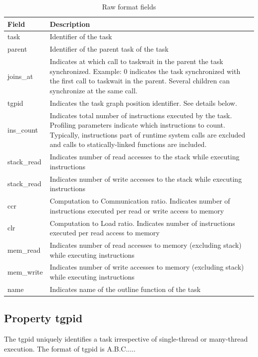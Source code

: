 \documentclass[11pt,a4paper,notitlepage]{article}
\begin{document}
\begin{table}[!htb]
\begin{tabular}{|p{2cm}|p{10cm}|}
\hline
\textbf{Field} & \textbf{Description} \\ \hline
task & Identifier of the task \\ \hline
parent & Identifier of the parent task of the task \\ \hline
joins\_at & Indicates at which call to taskwait in the parent the task synchronized. Example: 0 indicates the task synchronized with the first call to taskwait in the parent. Several children can synchronize at the same call.  \\ \hline
tgpid & Indicates the task graph position identifier. See details below.  \\ \hline
ins\_count & Indicates total number of instructions executed by the task. Profiling parameters indicate which instructions to count. Typically, instructions part of runtime system calls are excluded and calls to statically-linked functions are included.  \\ \hline
stack\_read & Indicates number of read accesses to the stack while executing instructions  \\ \hline
stack\_read & Indicates number of write accesses to the stack while executing instructions \\ \hline
ccr & Computation to Communication ratio. Indicates number of instructions executed per read or write access to memory  \\ \hline
clr & Computation to Load ratio. Indicates number of instructions executed per read access to memory  \\ \hline
mem\_read & Indicates number of read accesses to memory (excluding stack) while executing instructions  \\ \hline
mem\_write & Indicates number of write accesses to memory (excluding stack) while executing instructions  \\ \hline
name & Indicates name of the outline function of the task \\ \hline
\end{tabular}
\caption{Raw format fields}
\label{tab:raw-format}
\end{table}

\subsection{Property tgpid}
The tgpid uniquely identifies a task irrespective of single-thread or many-thread execution. 
The format of tgpid is A.B.C.....
\end{document}

